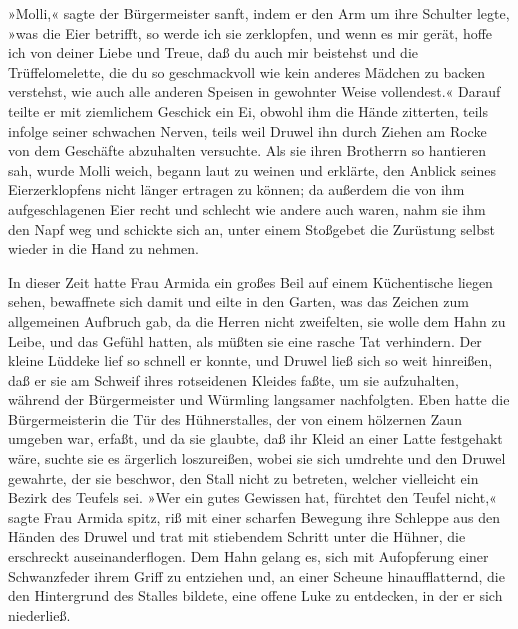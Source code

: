 »Molli,« sagte der Bürgermeister sanft, indem er den Arm um ihre
Schulter legte, »was die Eier betrifft, so werde ich sie
zerklopfen, und wenn es mir gerät, hoffe ich von deiner Liebe und
Treue, daß du auch mir beistehst und die Trüffelomelette, die du so
geschmackvoll wie kein anderes Mädchen zu backen verstehst, wie
auch alle anderen Speisen in gewohnter Weise vollendest.« Darauf
teilte er mit ziemlichem Geschick ein Ei, obwohl ihm die Hände
zitterten, teils infolge seiner schwachen Nerven, teils weil Druwel
ihn durch Ziehen am Rocke von dem Geschäfte abzuhalten versuchte.
Als sie ihren Brotherrn so hantieren sah, wurde Molli weich, begann
laut zu weinen und erklärte, den Anblick seines Eierzerklopfens
nicht länger ertragen zu können; da außerdem die von ihm
aufgeschlagenen Eier recht und schlecht wie andere auch waren, nahm
sie ihm den Napf weg und schickte sich an, unter einem Stoßgebet
die Zurüstung selbst wieder in die Hand zu nehmen.

In dieser Zeit hatte Frau Armida ein großes Beil auf einem
Küchentische liegen sehen, bewaffnete sich damit und eilte in den
Garten, was das Zeichen zum allgemeinen Aufbruch gab, da die Herren
nicht zweifelten, sie wolle dem Hahn zu Leibe, und das Gefühl
hatten, als müßten sie eine rasche Tat verhindern. Der kleine
Lüddeke lief so schnell er konnte, und Druwel ließ sich so weit
hinreißen, daß er sie am Schweif ihres rotseidenen Kleides faßte,
um sie \pagenum{[17]} aufzuhalten, während der Bürgermeister und
Würmling langsamer nachfolgten. Eben hatte die Bürgermeisterin die
Tür des Hühnerstalles, der von einem hölzernen Zaun umgeben war,
erfaßt, und da sie glaubte, daß ihr Kleid an einer Latte festgehakt
wäre, suchte sie es ärgerlich loszureißen, wobei sie sich umdrehte
und den Druwel gewahrte, der sie beschwor, den Stall nicht zu
betreten, welcher vielleicht ein Bezirk des Teufels sei. »Wer ein
gutes Gewissen hat, fürchtet den Teufel nicht,« sagte Frau Armida
spitz, riß mit einer scharfen Bewegung ihre Schleppe aus den Händen
des Druwel und trat mit stiebendem Schritt unter die Hühner, die
erschreckt auseinanderflogen. Dem Hahn gelang es, sich mit
Aufopferung einer Schwanzfeder ihrem Griff zu entziehen und, an
einer Scheune hinaufflatternd, die den Hintergrund des Stalles
bildete, eine offene Luke zu entdecken, in der er sich niederließ.


